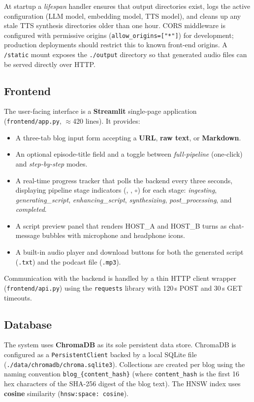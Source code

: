\documentclass[sigconf,natbib=false]{acmart}   %
\begin{document}
At startup a \emph{lifespan} handler ensures that output directories exist, logs the active configuration (LLM model, embedding model, TTS model), and cleans up any stale TTS synthesis directories older than one hour.  CORS middleware is configured with permissive origins (\texttt{allow\_origins=["*"]}) for development; production deployments should restrict this to known front-end origins.  A \texttt{/static} mount exposes the \texttt{./output} directory so that generated audio files can be served directly over HTTP.

\subsection{Frontend}
The user-facing interface is a \textbf{Streamlit} \cite{Streamlit2024} single-page application (\texttt{frontend/app.py}, $\approx$420 lines).  It provides:
\begin{itemize}[nosep]
  \item A three-tab blog input form accepting a \textbf{URL}, \textbf{raw text}, or \textbf{Markdown}.
  \item An optional episode-title field and a toggle between \emph{full-pipeline} (one-click) and \emph{step-by-step} modes.
  \item A real-time progress tracker that polls the backend every three seconds, displaying pipeline stage indicators (\checkmark, \textbullet, $\circ$) for each stage: \textit{ingesting}, \textit{generating\_script}, \textit{enhancing\_script}, \textit{synthesizing}, \textit{post\_processing}, and \textit{completed}.
  \item A script preview panel that renders HOST\_A and HOST\_B turns as chat-message bubbles with microphone and headphone icons.
  \item A built-in audio player and download buttons for both the generated script (\texttt{.txt}) and the podcast file (\texttt{.mp3}).
\end{itemize}
Communication with the backend is handled by a thin HTTP client wrapper (\texttt{frontend/api.py}) using the \texttt{requests} library with 120\,s POST and 30\,s GET timeouts.

\subsection{Database}
The system uses \textbf{ChromaDB} \cite{ChromaDB2024} as its sole persistent data store.  ChromaDB is configured as a \texttt{PersistentClient} backed by a local SQLite file (\texttt{./data/chromadb/chroma.sqlite3}).  Collections are created per blog using the naming convention \texttt{blog\_\{content\_hash\}} (where \texttt{content\_hash} is the first 16 hex characters of the SHA-256 digest of the blog text).  The HNSW index uses \textbf{cosine} similarity (\texttt{hnsw:space: cosine}).
\end{document}

